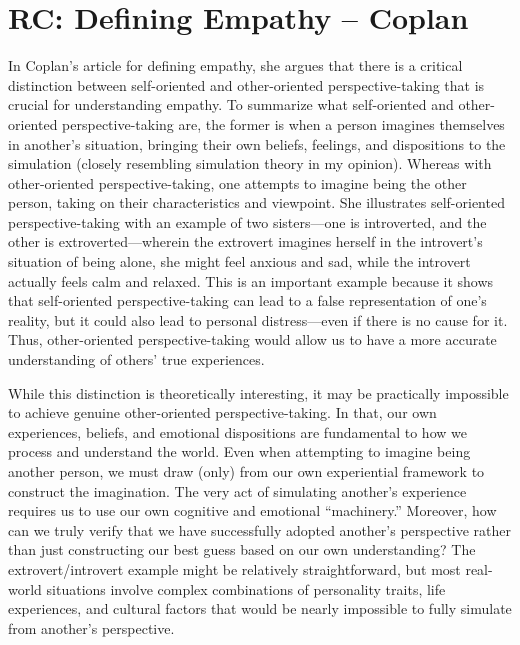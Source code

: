 \documentclass[11pt]{article}
\begin{document}
\section{RC: Defining Empathy -- Coplan}

In Coplan's article for defining empathy, she argues that there is a critical distinction between self-oriented and other-oriented perspective-taking that is crucial for understanding empathy. To summarize what self-oriented and other-oriented perspective-taking are, the former is when a person imagines themselves in another's situation, bringing their own beliefs, feelings, and dispositions to the simulation (closely resembling simulation theory in my opinion). Whereas with other-oriented perspective-taking, one attempts to imagine being the other person, taking on their characteristics and viewpoint. She illustrates self-oriented perspective-taking with an example of two sisters—one is introverted, and the other is extroverted—wherein the extrovert imagines herself in the introvert's situation of being alone, she might feel anxious and sad, while the introvert actually feels calm and relaxed. This is an important example because it shows that self-oriented perspective-taking can lead to a false representation of one's reality, but it could also lead to personal distress—even if there is no cause for it. Thus, other-oriented perspective-taking would allow us to have a more accurate understanding of others' true experiences. 

While this distinction is theoretically interesting, it may be practically impossible to achieve genuine other-oriented perspective-taking. In that, our own experiences, beliefs, and emotional dispositions are fundamental to how we process and understand the world. Even when attempting to imagine being another person, we must draw (only) from our own experiential framework to construct the imagination. The very act of simulating another's experience requires us to use our own cognitive and emotional ``machinery.'' Moreover, how can we truly verify that we have successfully adopted another's perspective rather than just constructing our best guess based on our own understanding? The extrovert/introvert example might be relatively straightforward, but most real-world situations involve complex combinations of personality traits, life experiences, and cultural factors that would be nearly impossible to fully simulate from another's perspective.
\end{document}
